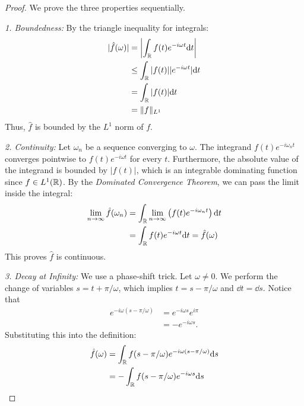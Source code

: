 \begin{proof}
We prove the three properties sequentially.

\textit{1. Boundedness:}
By the triangle inequality for integrals:
\begin{equation}
\begin{aligned}
|\hat{f}(\omega)| &= \left| \int_{\mathbb{R}} f(t) e^{-i\omega t} \mathrm{d} t \right| \\
&\leq \int_{\mathbb{R}} |f(t)| |e^{-i\omega t}| \mathrm{d} t \\
&= \int_{\mathbb{R}} |f(t)| \mathrm{d} t \\
&= \|f\|_{L^1}
\end{aligned}
\end{equation}
Thus, $\hat{f}$ is bounded by the $L^1$ norm of $f$.

\textit{2. Continuity:}
Let $\omega_n$ be a sequence converging to $\omega$. The integrand $f(t) e^{-i\omega_n t}$ converges pointwise to $f(t) e^{-i\omega t}$ for every $t$. Furthermore, the absolute value of the integrand is bounded by $|f(t)|$, which is an integrable dominating function since $f \in L^1(\mathbb{R})$. By the \textit{Dominated Convergence Theorem}, we can pass the limit inside the integral:
\begin{equation}
\begin{aligned}
    \lim_{n \to \infty} \hat{f}(\omega_n)
    &= \int_{\mathbb{R}} \lim_{n \to \infty} \left( f(t) e^{-i\omega_n t} \right) \mathrm{d} t \\
    &= \int_{\mathbb{R}} f(t) e^{-i\omega t} \mathrm{d} t = \hat{f}(\omega)
    \end{aligned}
\end{equation}
This proves $\hat{f}$ is continuous.

\textit{3. Decay at Infinity:}
We use a phase-shift trick. Let $\omega \neq 0$. We perform the change of variables $s = t + \pi/\omega$, which implies $t = s - \pi/\omega$ and $\dd t = \dd s$. Notice that
\[
\begin{aligned}
e^{-i\omega(s - \pi/\omega)} &= e^{-i\omega s} e^{i\pi} \\
&= -e^{-i\omega s}.
\end{aligned}
\]
Substituting this into the definition:
\begin{equation}
\begin{aligned}
\hat{f}(\omega) &= \int_{\mathbb{R}} f(s - \pi/\omega) e^{-i\omega (s - \pi/\omega)} \mathrm{d} s \\
&= -\int_{\mathbb{R}} f(s - \pi/\omega) e^{-i\omega s} \mathrm{d} s
\end{aligned}
\end{equation}


\end{proof}
